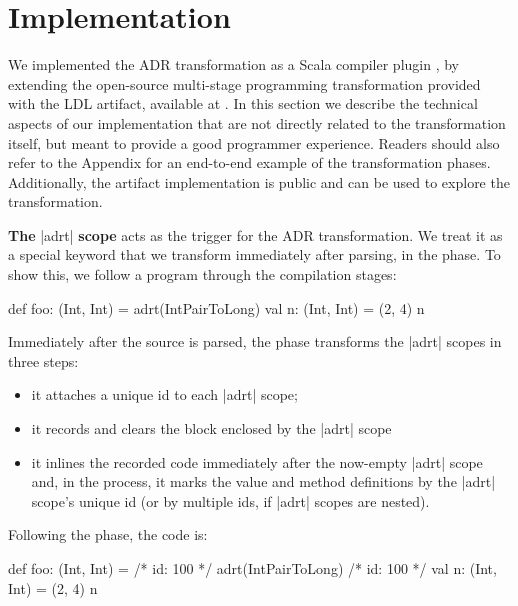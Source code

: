 \section{Implementation}
\label{ildl:sec:impl}

We implemented the ADR transformation as a Scala compiler plugin \cite{ildl-plugin}, by extending the open-source multi-stage programming transformation provided with the LDL artifact, available at \cite{ldl-staging-plugin}. In this section we describe the technical aspects of our implementation that are not directly related to the transformation itself, but meant to provide a good programmer experience. Readers should also refer to the Appendix for an end-to-end example of the transformation phases. Additionally, the artifact implementation is public and can be used to explore the transformation.


\noindent \textbf{The} |adrt| \textbf{scope} acts as the trigger for the ADR transformation.
We treat it as a special keyword that we transform immediately after parsing, in the \postparser{} phase.
To show this, we follow a program through the compilation stages:

\begin{lstlisting-nobreak}
def foo: (Int, Int) = {
  adrt(IntPairToLong) {
    val n: (Int, Int) = (2, 4)
  }
  n
}
\end{lstlisting-nobreak}

\noindent
Immediately after the source is parsed, the \postparser{} phase transforms the |adrt| scopes in three steps:


\begin{itemize}
\item it attaches a unique id to each |adrt| scope;
\item it records and clears the block enclosed by the |adrt| scope
\item it inlines the recorded code immediately after the now-empty
|adrt| scope and, in the process, it marks the value and method definitions
by the |adrt| scope's unique id (or by multiple ids, if |adrt| scopes are nested).
\end{itemize}


\noindent Following the \postparser{} phase, the code is:

\begin{lstlisting-nobreak}
def foo: (Int, Int) = {
  /* id: 100 */ adrt(IntPairToLong) {}
  /* id: 100 */ val n: (Int, Int) = (2, 4)
  n
}
\end{lstlisting-nobreak}

